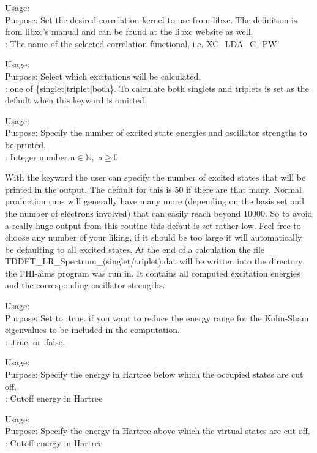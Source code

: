  {
\noindent
Usage:  \\
Purpose: Set the desired correlation kernel to use from libxc. The definition is from libxc's manual and can be found at the 
libxc website as well.\\
: The name of the selected correlation functional, i.e. XC\_LDA\_C\_PW
}

 {
\noindent
Usage:  \\
Purpose: Select which excitations will be calculated.\\
: one of \{singlet|triplet|both\}. To calculate both singlets and triplets is set as the default when this keyword is omitted.
}

 {
\noindent
Usage:  \\
Purpose: Specify the number of excited state energies and oscillator strengths to be printed.\\
: Integer number $\mathtt{n}\in\mathbb{N},\;\mathtt{n}\ge 0$
}

With the keyword  the user can specify the number of excited states that
will be printed in the output. The default for this is 50 if there are that many. Normal production runs will generally have many more (depending on the
basis set and the number of electrons involved) that can easily reach beyond 10000. So to avoid a really huge output from this routine this defaut is
set rather low. Feel free to choose any number of your liking, if it should be too large it will automatically be defaulting to all excited states. At the end
of a calculation the file TDDFT\_LR\_Spectrum\_(singlet/triplet).dat will be written into the directory the FHI-aims program was run in.
It contains all computed excitation energies and the corresponding oscillator strengths.

 {
\noindent
Usage:  \\
Purpose: Set to .true. if you want to reduce the energy range for the Kohn-Sham eigenvalues to be included in the computation.\\
: .true. or .false.\\
}

 {
\noindent
Usage:  \\
Purpose: Specify the energy in Hartree below which the occupied states are cut off.\\
: Cutoff energy in Hartree
}

 {
\noindent
Usage:  \\
Purpose: Specify the energy in Hartree above which the virtual states are cut off.\\
: Cutoff energy in Hartree
}
